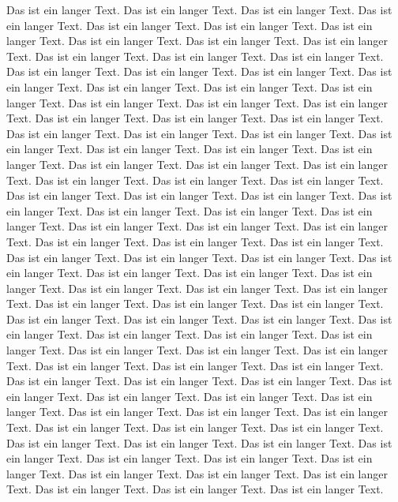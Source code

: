 \documentclass[twoside]{article}
\begin{document}
Das ist ein langer Text. Das ist ein langer Text.
Das ist ein langer Text. Das ist ein langer Text.
Das ist ein langer Text. Das ist ein langer Text.
Das ist ein langer Text. Das ist ein langer Text.
Das ist ein langer Text. Das ist ein langer Text.
Das ist ein langer Text. Das ist ein langer Text.
Das ist ein langer Text. Das ist ein langer Text.
Das ist ein langer Text. Das ist ein langer Text.
Das ist ein langer Text. Das ist ein langer Text.
Das ist ein langer Text. Das ist ein langer Text.
Das ist ein langer Text. Das ist ein langer Text.
Das ist ein langer Text. Das ist ein langer Text.
Das ist ein langer Text. Das ist ein langer Text.
Das ist ein langer Text. Das ist ein langer Text.
Das ist ein langer Text. Das ist ein langer Text.
Das ist ein langer Text. Das ist ein langer Text.
Das ist ein langer Text. Das ist ein langer Text.
Das ist ein langer Text. Das ist ein langer Text.
Das ist ein langer Text. Das ist ein langer Text.
Das ist ein langer Text. Das ist ein langer Text.
Das ist ein langer Text. Das ist ein langer Text.
Das ist ein langer Text. Das ist ein langer Text.
Das ist ein langer Text. Das ist ein langer Text.
Das ist ein langer Text. Das ist ein langer Text.
Das ist ein langer Text. Das ist ein langer Text.
Das ist ein langer Text. Das ist ein langer Text.
Das ist ein langer Text. Das ist ein langer Text.
Das ist ein langer Text. Das ist ein langer Text.
Das ist ein langer Text. Das ist ein langer Text.
Das ist ein langer Text. Das ist ein langer Text.
Das ist ein langer Text. Das ist ein langer Text.
Das ist ein langer Text. Das ist ein langer Text.
Das ist ein langer Text. Das ist ein langer Text.
Das ist ein langer Text. Das ist ein langer Text.
Das ist ein langer Text. Das ist ein langer Text.
Das ist ein langer Text. Das ist ein langer Text.
Das ist ein langer Text. Das ist ein langer Text.
Das ist ein langer Text. Das ist ein langer Text.
Das ist ein langer Text. Das ist ein langer Text.
Das ist ein langer Text. Das ist ein langer Text.
Das ist ein langer Text. Das ist ein langer Text.
Das ist ein langer Text. Das ist ein langer Text.
Das ist ein langer Text. Das ist ein langer Text.
Das ist ein langer Text. Das ist ein langer Text.
Das ist ein langer Text. Das ist ein langer Text.
Das ist ein langer Text. Das ist ein langer Text.
Das ist ein langer Text. Das ist ein langer Text.
Das ist ein langer Text. Das ist ein langer Text.
Das ist ein langer Text. Das ist ein langer Text.
Das ist ein langer Text. Das ist ein langer Text.
Das ist ein langer Text. Das ist ein langer Text.
Das ist ein langer Text. Das ist ein langer Text.
\end{document}
